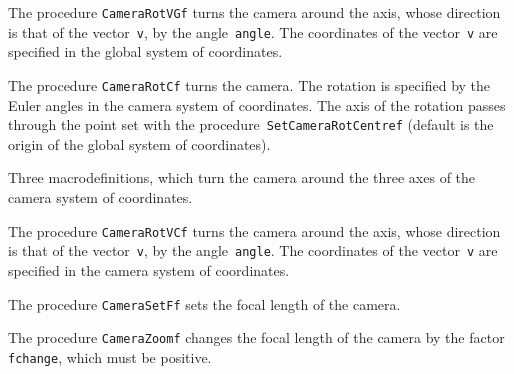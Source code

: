 \vspace{\bigskipamount}
The procedure \texttt{CameraRotVGf} turns the camera around the axis,
whose direction is that of the vector~\texttt{v}, by the
angle~\texttt{angle}.
The coordinates of the vector~\texttt{v} are specified in the global system   
of coordinates.

\vspace{\bigskipamount}
The procedure \texttt{CameraRotCf} turns the camera. The rotation
is specified by the Euler angles in the camera system of coordinates.
The axis of the rotation passes through the point set with
the procedure~\texttt{SetCameraRotCentref} (default is the origin of
the global system of coordinates).

\vspace{\bigskipamount}
Three macrodefinitions, which turn the camera around the three axes of the
camera system of coordinates.

\vspace{\bigskipamount}
The procedure \texttt{CameraRotVCf} turns the camera around the axis,
whose direction is that of the vector~\texttt{v}, by the
angle~\texttt{angle}.
The coordinates of the vector~\texttt{v} are specified in the camera system   
of coordinates.

\vspace{\bigskipamount}
The procedure \texttt{CameraSetFf} sets the focal length of the camera.

\vspace{\bigskipamount}
The procedure \texttt{CameraZoomf} changes the focal length of the camera
by the factor \texttt{fchange}, which must be positive.

